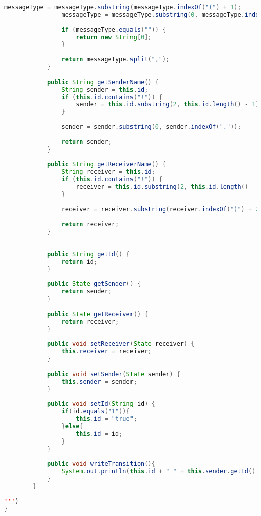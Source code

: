 \begin{lstlisting}[language=java, caption={példa unit teszteset.},captionpos=b]
				messageType = messageType.substring(messageType.indexOf("(") + 1);
				messageType = messageType.substring(0, messageType.indexOf(")"));
		
				if (messageType.equals("")) {
					return new String[0];
				}
				
				return messageType.split(",");
			}
			
			public String getSenderName() {
				String sender = this.id;
				if (this.id.contains("!")) {
					sender = this.id.substring(2, this.id.length() - 1);
				}
				
				sender = sender.substring(0, sender.indexOf("."));
				
				return sender;
			}
			
			public String getReceiverName() {
				String receiver = this.id;
				if (this.id.contains("!")) {
					receiver = this.id.substring(2, this.id.length() - 1);
				}
				
				receiver = receiver.substring(receiver.indexOf(")") + 2);
				
				return receiver;
			}
		
		
			public String getId() {
				return id;
			}
		
			public State getSender() {
				return sender;
			}
		
			public State getReceiver() {
				return receiver;
			}
		
			public void setReceiver(State receiver) {
				this.receiver = receiver;
			}
		
			public void setSender(State sender) {
				this.sender = sender;
			}
		
			public void setId(String id) {
				if(id.equals("1")){
					this.id = "true";
				}else{
					this.id = id;
				}
			}
			
			public void writeTransition(){
				System.out.println(this.id + " " + this.sender.getId() + "->" + this.receiver.getId());
			}
		}
		
''')
}
\end{lstlisting}